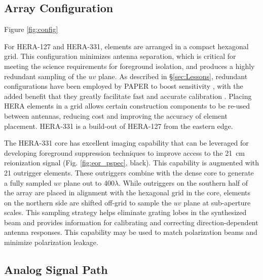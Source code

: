 \documentclass[ars]{/Users/daviddeboer1/Documents/Papers/Copernicus_LaTeX_Package_v_2_7/copernicus}
\begin{document}
\subsection{Array Configuration}

 Figure \ref{fig:config}

For HERA-127 and HERA-331, elements are arranged in a compact hexagonal grid.
This configuration minimizes antenna separation, which is critical for meeting
the science requirements for foreground isolation, and 
produces a highly redundant sampling of the $uv$ plane.  As described in
\S\ref{sec:Lessons}, redundant configurations have been employed by PAPER to
boost sensitivity , with the added benefit that they
greatly facilitate fast and accurate calibration
.  Placing HERA elements in a
grid allows certain construction components to be re-used between antennas,
reducing cost and improving the accuracy of element placement.  HERA-331 
is a build-out of HERA-127 from the eastern edge.

The HERA-331 core has excellent
imaging capability that can be leveraged for developing foreground suppression techniques
to improve access to the 21~cm reionization signal 
(Fig. \ref{fig:eor_pspec}, black).
This capability is augmented with 21 outrigger elements.  These outriggers
combine with the dense core to generate a fully
sampled $uv$ plane out to 400$\lambda$.  While outriggers on the southern half of the array are
placed in alignment with the hexagonal grid in the core, elements on the northern side are
shifted off-grid to sample the $uv$ plane at sub-aperture scales.
This sampling strategy helps eliminate grating lobes in the
synthesized beam and provides information for
calibrating and correcting direction-dependent antenna responses.  This capability may
be used to match polarization beams and minimize
polarization leakage.

\subsection{Analog Signal Path}
\end{document}

